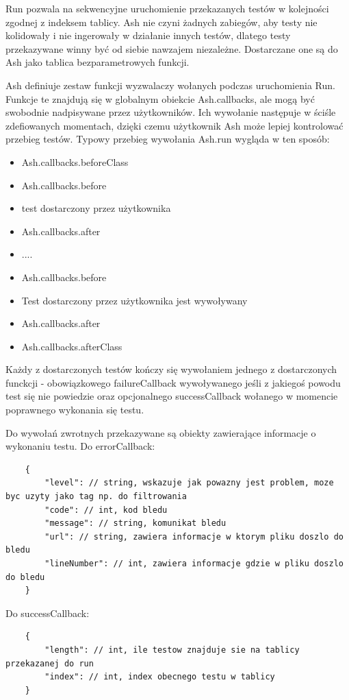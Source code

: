 \documentclass[brudnopis]{xmgr}
\begin{document}
Run pozwala na sekwencyjne uruchomienie przekazanych testów w kolejności zgodnej z indeksem tablicy. Ash nie czyni żadnych zabiegów, aby testy nie kolidowały i nie ingerowały w działanie innych testów, dlatego testy przekazywane winny być od siebie nawzajem niezależne. Dostarczane one są do Ash jako tablica bezparametrowych funkcji.

Ash definiuje zestaw funkcji wyzwalaczy wołanych podczas uruchomienia Run. Funkcje te znajdują się w globalnym obiekcie Ash.callbacks, ale mogą być swobodnie nadpisywane przez użytkowników. Ich wywołanie następuje w ściśle zdefiowanych momentach, dzięki czemu użytkownik Ash może lepiej kontrolować przebieg testów. Typowy przebieg wywołania Ash.run wygląda w ten sposób:

\begin{itemize}
  \item Ash.callbacks.beforeClass
  \item Ash.callbacks.before
  \item {test dostarczony przez użytkownika}
  \item Ash.callbacks.after
  \item ....
  \item Ash.callbacks.before
  \item Test dostarczony przez użytkownika jest wywoływany
  \item Ash.callbacks.after
  \item Ash.callbacks.afterClass
\end{itemize}

Każdy z dostarczonych testów kończy się wywołaniem jednego z dostarczonych funckcji - obowiązkowego failureCallback wywoływanego jeśli z jakiegoś powodu test się nie powiedzie oraz opcjonalnego successCallback wołanego w momencie poprawnego wykonania się testu.

Do wywołań zwrotnych przekazywane są obiekty zawierające informacje o wykonaniu testu. Do errorCallback:

\begin{lstlisting}
	{
		"level": // string, wskazuje jak powazny jest problem, moze byc uzyty jako tag np. do filtrowania 
		"code": // int, kod bledu
		"message": // string, komunikat bledu 
		"url": // string, zawiera informacje w ktorym pliku doszlo do bledu 
		"lineNumber": // int, zawiera informacje gdzie w pliku doszlo do bledu
	}
\end{lstlisting}

Do successCallback: 

\begin{lstlisting}
	{
		"length": // int, ile testow znajduje sie na tablicy przekazanej do run 
		"index": // int, index obecnego testu w tablicy 
	}
\end{lstlisting}
\end{document}
